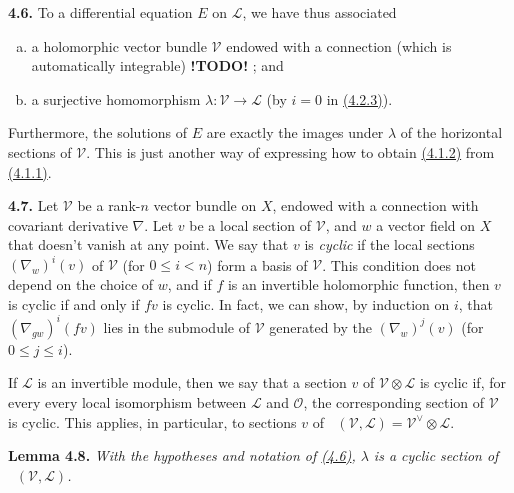 \documentclass{report}
\newenvironment{itenv}[1]
  {\phantomsection\par\medskip\noindent\textbf{#1.}\itshape}
  {\medskip}
\newenvironment{rmenv}[1]
  {\phantomsection\par\medskip\noindent\textbf{#1.}\rmfamily}
  {\medskip}
\newcommand{\scr}[1]{{\mathscr{#1}}}
\renewcommand{\cal}[1]{{\mathcal{#1}}}
\renewcommand{\leq}{\leqslant}
\DeclareMathOperator{\shHom}{\underline{Hom}}
\newcommand{\todo}{\textbf{ !TODO! }}
\newcommand{\oldpage}[1]{\marginpar{\footnotesize$\Big\vert$ \textit{p.~#1}}}
\begin{document}
\begin{rmenv}{4.6}
\label{I.4.6}
  To a differential equation $E$ on $\scr{L}$, we have thus associated
  \begin{enumerate}[a)]
    \item a holomorphic vector bundle $\cal{V}$ endowed with a connection (which is automatically integrable) \todo ; and
    \item a surjective homomorphism $\lambda\colon\cal{V}\to\scr{L}$ (by $i=0$ in \hyperref[I.4.2.3]{(4.2.3)}).
  \end{enumerate}
  Furthermore, the solutions of $E$ are exactly the images under $\lambda$ of the horizontal sections of $\cal{V}$.
  This is just another way of expressing how to obtain \hyperref[I.4.1.2]{(4.1.2)} from \hyperref[I.4.1.1]{(4.1.1)}.
\end{rmenv}

\oldpage{26}
\begin{rmenv}{4.7}
\label{I.4.7}
  Let $\cal{V}$ be a rank-$n$ vector bundle on $X$, endowed with a connection with covariant derivative $\nabla$.
  Let $v$ be a local section of $\cal{V}$, and $w$ a vector field on $X$ that doesn't vanish at any point.
  We say that $v$ is \emph{cyclic} if the local sections $(\nabla_w)^i(v)$ of $\cal{V}$ (for $0\leq i<n$) form a basis of $\cal{V}$.
  This condition does not depend on the choice of $w$, and if $f$ is an invertible holomorphic function, then $v$ is cyclic if and only if $fv$ is cyclic.
  In fact, we can show, by induction on $i$, that $(\nabla_{gw})^i(fv)$ lies in the submodule of $\cal{V}$ generated by the $(\nabla_w)^j(v)$ (for $0\leq j\leq i$).

  If $\scr{L}$ is an invertible module, then we say that a section $v$ of $\cal{V}\otimes\scr{L}$ is cyclic if, for every every local isomorphism between $\scr{L}$ and $\cal{O}$, the corresponding section of $\cal{V}$ is cyclic.
  This applies, in particular, to sections $v$ of $\shHom(\cal{V},\scr{L})=\cal{V}^\vee\otimes\scr{L}$.
\end{rmenv}

\begin{itenv}{Lemma 4.8}
\label{I.4.8}
  With the hypotheses and notation of \hyperref[I.4.6]{(4.6)}, $\lambda$ is a cyclic section of $\shHom(\cal{V},\scr{L})$.
\end{itenv}
\end{document}
